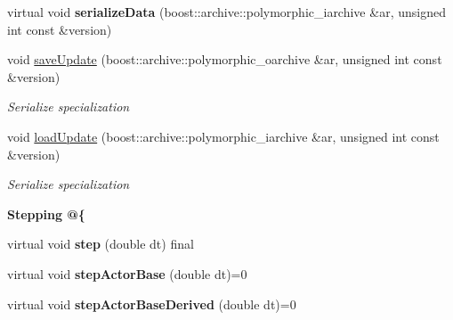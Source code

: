 \begin{DoxyCompactItemize}
\item 
\hypertarget{classNeb_1_1Actor_1_1Base_aea6b73147535dde24fa95ec2f82c759f}{virtual void {\bfseries serialize\-Data} (boost\-::archive\-::polymorphic\-\_\-iarchive \&ar, unsigned int const \&version)}\label{classNeb_1_1Actor_1_1Base_aea6b73147535dde24fa95ec2f82c759f}

\item 
\hypertarget{classNeb_1_1Actor_1_1Base_aa4edb51f746f8d68d9fe39898e93d6e9}{void \hyperlink{classNeb_1_1Actor_1_1Base_aa4edb51f746f8d68d9fe39898e93d6e9}{save\-Update} (boost\-::archive\-::polymorphic\-\_\-oarchive \&ar, unsigned int const \&version)}\label{classNeb_1_1Actor_1_1Base_aa4edb51f746f8d68d9fe39898e93d6e9}

\begin{DoxyCompactList}\small\item\em Serialize specialization \end{DoxyCompactList}\item 
\hypertarget{classNeb_1_1Actor_1_1Base_a188f918586281aa28c3cc31044614aba}{void \hyperlink{classNeb_1_1Actor_1_1Base_a188f918586281aa28c3cc31044614aba}{load\-Update} (boost\-::archive\-::polymorphic\-\_\-iarchive \&ar, unsigned int const \&version)}\label{classNeb_1_1Actor_1_1Base_a188f918586281aa28c3cc31044614aba}

\begin{DoxyCompactList}\small\item\em Serialize specialization \end{DoxyCompactList}\end{DoxyCompactItemize}
\begin{Indent}{\bf Stepping @\{}\par
\begin{DoxyCompactItemize}
\item 
\hypertarget{classNeb_1_1Actor_1_1Base_a6467b890b69868f297964266a682b3ec}{virtual void {\bfseries step} (double dt) final}\label{classNeb_1_1Actor_1_1Base_a6467b890b69868f297964266a682b3ec}

\item 
\hypertarget{classNeb_1_1Actor_1_1Base_a78adc865414366144cc4ef32f3ff286f}{virtual void {\bfseries step\-Actor\-Base} (double dt)=0}\label{classNeb_1_1Actor_1_1Base_a78adc865414366144cc4ef32f3ff286f}

\item 
\hypertarget{classNeb_1_1Actor_1_1Base_a1f86d5026528ec9a296b34efc55453de}{virtual void {\bfseries step\-Actor\-Base\-Derived} (double dt)=0}\label{classNeb_1_1Actor_1_1Base_a1f86d5026528ec9a296b34efc55453de}

\end{DoxyCompactItemize}
\end{Indent}

